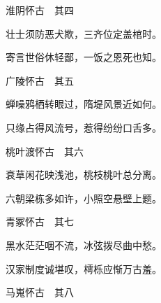 \begin{poem}
\begin{pl}
        淮阴怀古　其四
    \end{pl}
    \begin{pl}

        壮士须防恶犬欺，三齐位定盖棺时。
    \end{pl}
    \begin{pl}

        寄言世俗休轻鄙，一饭之恩死也知。
    \end{pl}

    \emptypl

    \begin{pl}

        广陵怀古　其五
    \end{pl}
    \begin{pl}

        蝉噪鸦栖转眼过，隋堤风景近如何。
    \end{pl}
    \begin{pl}

        只缘占得风流号，惹得纷纷口舌多。
    \end{pl}

    \emptypl

    \begin{pl}

        桃叶渡怀古　其六
    \end{pl}
    \begin{pl}

        衰草闲花映浅池，桃枝桃叶总分离。
    \end{pl}
    \begin{pl}

        六朝梁栋多如许，小照空悬壁上题。
    \end{pl}
    \emptypl
    \begin{pl}

        青冢怀古　其七
    \end{pl}
    \begin{pl}

        黑水茫茫咽不流，冰弦拨尽曲中愁。
    \end{pl}
    \begin{pl}

        汉家制度诚堪叹，樗栎应惭万古羞。
    \end{pl}

    \emptypl

    \begin{pl}

        马嵬怀古　其八
    \end{pl}
    \begin{pl}


\end{pl}
\end{poem}
